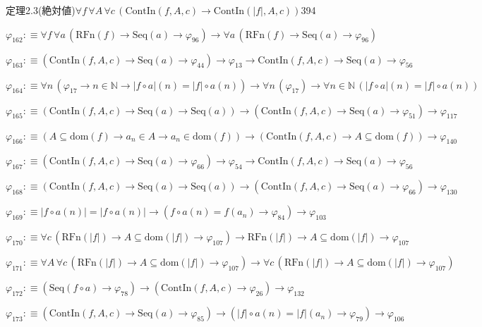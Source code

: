 \begin{fullproof}{定理2.3(絶対値)}{$\forall f\,\forall A\,\forall c\,(\mathrm{ContIn}(f,A,c) \to \mathrm{ContIn}(\lvert f \rvert,A,c))$}{394}
\begin{abbrevlist}
\item $\varphi_{162} :\equiv \forall f\,\forall a\,(\mathrm{RFn}(f) \to \mathrm{Seq}(a) \to \varphi_{96}) \to \forall a\,(\mathrm{RFn}(f) \to \mathrm{Seq}(a) \to \varphi_{96})$
\item $\varphi_{163} :\equiv (\mathrm{ContIn}(f,A,c) \to \mathrm{Seq}(a) \to \varphi_{44}) \to \varphi_{13} \to \mathrm{ContIn}(f,A,c) \to \mathrm{Seq}(a) \to \varphi_{56}$
\item $\varphi_{164} :\equiv \forall n\,(\varphi_{17} \to n \in \mathbb{N} \to \lvert f \circ a \rvert(n) = \lvert f \rvert \circ a(n)) \to \forall n\,(\varphi_{17}) \to \forall n \in \mathbb{N}\,(\lvert f \circ a \rvert(n) = \lvert f \rvert \circ a(n))$
\item $\varphi_{165} :\equiv (\mathrm{ContIn}(f,A,c) \to \mathrm{Seq}(a) \to \mathrm{Seq}(a)) \to (\mathrm{ContIn}(f,A,c) \to \mathrm{Seq}(a) \to \varphi_{51}) \to \varphi_{117}$
\item $\varphi_{166} :\equiv (A \subseteq \mathrm{dom}(f) \to a_{n} \in A \to a_{n} \in \mathrm{dom}(f)) \to (\mathrm{ContIn}(f,A,c) \to A \subseteq \mathrm{dom}(f)) \to \varphi_{140}$
\item $\varphi_{167} :\equiv (\mathrm{ContIn}(f,A,c) \to \mathrm{Seq}(a) \to \varphi_{66}) \to \varphi_{54} \to \mathrm{ContIn}(f,A,c) \to \mathrm{Seq}(a) \to \varphi_{56}$
\item $\varphi_{168} :\equiv (\mathrm{ContIn}(f,A,c) \to \mathrm{Seq}(a) \to \mathrm{Seq}(a)) \to (\mathrm{ContIn}(f,A,c) \to \mathrm{Seq}(a) \to \varphi_{66}) \to \varphi_{130}$
\item $\varphi_{169} :\equiv \lvert f \circ a(n) \rvert = \lvert f \circ a(n) \rvert \to (f \circ a(n) = f(a_{n}) \to \varphi_{84}) \to \varphi_{103}$
\item $\varphi_{170} :\equiv \forall c\,(\mathrm{RFn}(\lvert f \rvert) \to A \subseteq \mathrm{dom}(\lvert f \rvert) \to \varphi_{107}) \to \mathrm{RFn}(\lvert f \rvert) \to A \subseteq \mathrm{dom}(\lvert f \rvert) \to \varphi_{107}$
\item $\varphi_{171} :\equiv \forall A\,\forall c\,(\mathrm{RFn}(\lvert f \rvert) \to A \subseteq \mathrm{dom}(\lvert f \rvert) \to \varphi_{107}) \to \forall c\,(\mathrm{RFn}(\lvert f \rvert) \to A \subseteq \mathrm{dom}(\lvert f \rvert) \to \varphi_{107})$
\item $\varphi_{172} :\equiv (\mathrm{Seq}(f \circ a) \to \varphi_{78}) \to (\mathrm{ContIn}(f,A,c) \to \varphi_{26}) \to \varphi_{132}$
\item $\varphi_{173} :\equiv (\mathrm{ContIn}(f,A,c) \to \mathrm{Seq}(a) \to \varphi_{85}) \to (\lvert f \rvert \circ a(n) = \lvert f \rvert(a_{n}) \to \varphi_{79}) \to \varphi_{106}$

\end{abbrevlist}
\end{fullproof}
